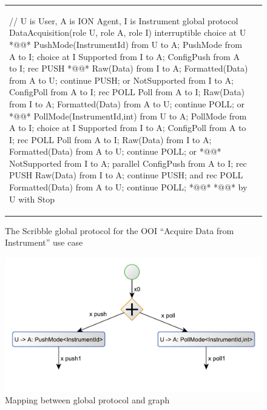 \documentclass[a4paper,11pt,twoside]{report}
\begin{document}


\begin{figure}[p]
\centering
\begin{tabular}{ll}
{\lstset{numbers=left}
\begin{SJLISTING}
// U is User, A is ION Agent, I is Instrument
global protocol DataAcquisition(role U, role A, role I) {
	interruptible {		choice at U { *@\label{line:userchoiceopen}@*
						PushMode(InstrumentId) from U to A;
						PushMode from A to I;
						choice at I {
							Supported from I to A;
							ConfigPush from A to I;
							rec PUSH { *@\label{line:firstrecursion}@*
								Raw(Data) from I to A;
								Formatted(Data) from A to U;
								continue PUSH;
							}
						} or {
							NotSupported from I to A;
							ConfigPoll from A to I;
							rec POLL {
								Poll from A to I;
								Raw(Data) from I to A;
								Formatted(Data) from A to U;
								continue POLL;
						}	}
					} or { *@\label{line:userchoiceor}@*
						PollMode(InstrumentId,int) from U to A;
						PollMode from A to I;
						choice at I {
							Supported from I to A;
							ConfigPoll from A to I;
							rec POLL {
								Poll from A to I;
								Raw(Data) from I to A;
								Formatted(Data) from A to U;
								continue POLL;
							}
						} or { *@\label{line:pollnotsupportedopen}@*
							NotSupported from I to A;
							parallel {
								ConfigPush from A to I;
								rec PUSH {
									Raw(Data) from I to A;
									continue PUSH;
								}
							} and {
								rec POLL {
									Formatted(Data) from A to U;
									continue POLL;	}
						}	} *@\label{line:pollnotsupportedclose}@*
					} *@\label{line:userchoiceclose}@*
	} by U with Stop
}
\end{SJLISTING}}
&
\end{tabular}
\caption{The Scribble global protocol for the OOI ``Acquire Data from Instrument'' use case\label{fig:ooi_example2}}
\end{figure}

\begin{figure}[h]
\begin{center}
\includegraphics[scale=0.8]{ooi_graph_details}
\end{center}
\caption{Mapping between global protocol and graph}
\label{fig:ooi_example1_details}
\end{figure}
\end{document}
